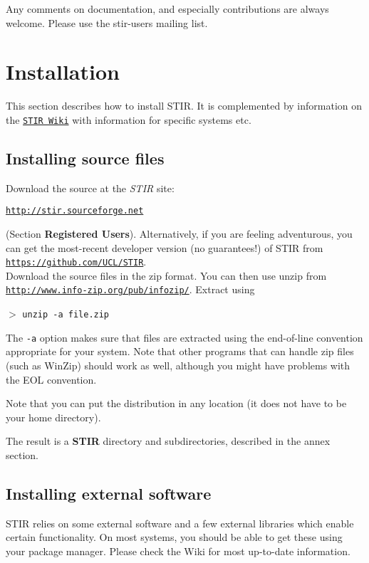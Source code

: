 \documentclass{article}
\def\url#1#2{\mbox{\href{#1}{\tt #2}}}
\newcommand{\cmdline}[1]{\par \noindent $>$ \texttt{#1}\par}
\begin{document}
Any comments on documentation, and especially contributions are 
always welcome. Please use the stir-users mailing list.

\section{
Installation}
This section describes how to install STIR. It is complemented by information on the
\url{http://sourceforge.net/stir}{STIR Wiki} with information for specific systems etc.

\subsection{
Installing source files}

Download the source at the \textit{STIR} site: 
\begin{center}
\url{http://stir.sourceforge.net }{http://stir.sourceforge.net} 
\end{center}
\noindent (Section \textbf{Registered Users}).
Alternatively, if you are feeling adventurous, you can get the most-recent
developer version (no guarantees!) of STIR from\\
\url{https://github.com/UCL/STIR}{https://github.com/UCL/STIR}.\\
Download the source files in the zip format. You can then use unzip from \\
\url{http://www.info-zip.org/pub/infozip/}{http://www.info-zip.org/pub/infozip/}. 
Extract using
\cmdline{unzip -a file.zip}


The \texttt{-a} option makes sure that files are extracted using the 
end-of-line convention appropriate for your system. Note that 
other programs that can handle zip files (such as WinZip) should 
work as well, although you might have problems with the EOL convention.


Note that you can put the distribution in any location (it does 
not have to be your home directory).


The result is a \textbf{STIR} directory and subdirectories, described 
in the annex section.

\subsection{
Installing external software}
STIR relies on some external software and a few external libraries which enable certain functionality. 
On most systems, you should be able to get these using your package manager. 
Please check the Wiki for most up-to-date information.
\end{document}
